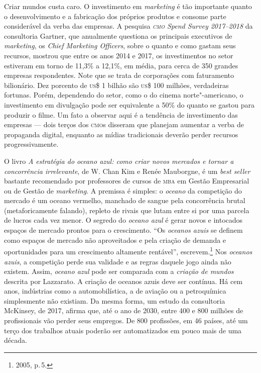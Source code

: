 Criar mundos custa caro. O investimento em \textit{marketing} é tão
importante quanto o desenvolvimento e a fabricação dos próprios produtos
e consome parte considerável da verba das empresas. A pesquisa \textit{\textsc{cmo}
Spend Survey 2017--2018} da consultoria Gartner, que anualmente questiona
os principais executivos de \textit{marketing}, os \textit{Chief Marketing
Officers}, sobre o quanto e como gastam seus recursos, mostrou que entre
os anos 2014 e 2017, os investimentos no setor estiveram em torno de
11,3\% a 12,1\%, em média, para cerca de 350 grandes empresas
respondentes. Note que se trata de corporações com faturamento
bilionário. Dez porcento de \textsc{us}\$ 1 bilhão são \textsc{us}\$ 100 milhões,
verdadeiras fortunas. Porém, dependendo do setor, como o do cinema
norte"-americano, o investimento em divulgação pode ser equivalente a
50\% do quanto se gastou para produzir o filme. Um fato a observar aqui
é a tendência de investimento das empresas --- dois terços dos \textsc{cmo}s
disseram que planejam aumentar a verba de propaganda digital, enquanto
as mídias tradicionais deverão perder recursos progressivamente.

O livro \textit{A estratégia do \textit{oceano azul}: como criar novos mercados e
tornar a concorrência irrelevante}, de W. Chan Kim e Renée Mauborgne, é
um \textit{best seller} bastante recomendado por professores de cursos de
\textsc{mba} em Gestão Empresarial ou de Gestão de \textit{marketing}. A premissa é
simples: o \textit{oceano} da competição do mercado é um oceano vermelho,
manchado de sangue pela concorrência brutal (metaforicamente falando),
repleto de rivais que lutam entre si por uma parcela de lucros cada vez
menor. O segredo do \textit{oceano azul} é gerar novos e intocados espaços de
mercado prontos para o crescimento. ``Os \textit{oceanos azuis} se definem como
espaços de mercado não aproveitados e pela criação de demanda e
oportunidades para um crescimento altamente rentável'', escrevem.\footnote{2005,
p.\,5.} Nos \textit{oceanos azuis}, a competição perde sua validade e as regras
daquele jogo ainda não existem. Assim, \textit{oceano azul} pode ser
comparada com a \textit{criação de mundos} descrita por Lazzarato. A
criação de oceanos azuis deve ser contínua. Há cem anos, indústrias como
a automobilística, a de aviação ou a petroquímica simplesmente não
existiam. Da mesma forma, um estudo da consultoria McKinsey, de 2017,
afirma que, até o ano de 2030, entre 400 e 800 milhões de profissionais
vão perder seus empregos. De 800 profissões, em 46 países, até um terço
dos trabalhos atuais poderão ser automatizados em pouco mais de uma
década.

